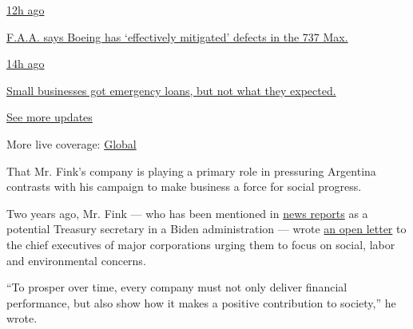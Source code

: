 \href{https://www.nytimes.com/live/2020/08/03/business/stock-market-today-coronavirus?action=click\&pgtype=Article\&state=default\&region=MAIN_CONTENT_1\&context=storylines_live_updates\#faa-says-boeing-has-effectively-mitigated-defects-in-the-737-max}{12h
ago}

\href{https://www.nytimes.com/live/2020/08/03/business/stock-market-today-coronavirus?action=click\&pgtype=Article\&state=default\&region=MAIN_CONTENT_1\&context=storylines_live_updates\#faa-says-boeing-has-effectively-mitigated-defects-in-the-737-max}{F.A.A.
says Boeing has `effectively mitigated' defects in the 737 Max.}

\href{https://www.nytimes.com/live/2020/08/03/business/stock-market-today-coronavirus?action=click\&pgtype=Article\&state=default\&region=MAIN_CONTENT_1\&context=storylines_live_updates\#small-businesses-got-emergency-loans-but-not-what-they-expected}{14h
ago}

\href{https://www.nytimes.com/live/2020/08/03/business/stock-market-today-coronavirus?action=click\&pgtype=Article\&state=default\&region=MAIN_CONTENT_1\&context=storylines_live_updates\#small-businesses-got-emergency-loans-but-not-what-they-expected}{Small
businesses got emergency loans, but not what they expected.}

\href{https://www.nytimes.com/live/2020/08/03/business/stock-market-today-coronavirus?action=click\&pgtype=Article\&state=default\&region=MAIN_CONTENT_1\&context=storylines_live_updates}{See
more updates}

More live coverage:
\href{https://www.nytimes.com/2020/08/03/world/coronavirus-covid-19.html?action=click\&pgtype=Article\&state=default\&region=MAIN_CONTENT_1\&context=storylines_live_updates}{Global}

That Mr. Fink's company is playing a primary role in pressuring
Argentina contrasts with his campaign to make business a force for
social progress.

Two years ago, Mr. Fink --- who has been mentioned in
\href{https://www.cnbc.com/2020/04/06/biden-donors-float-elizabeth-warren-larry-fink-others-for-key-roles.html}{news
reports} as a potential Treasury secretary in a Biden administration ---
wrote
\href{http://www.corporance.es/wp-content/uploads/2018/01/Larry-Fink-letter-to-CEOs-2018-1.pdf}{an
open letter} to the chief executives of major corporations urging them
to focus on social, labor and environmental concerns.

``To prosper over time, every company must not only deliver financial
performance, but also show how it makes a positive contribution to
society,'' he wrote.

